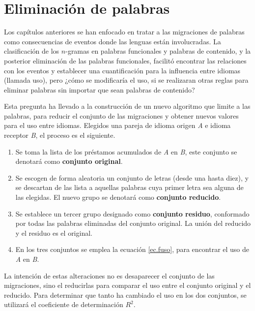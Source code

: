 \chapter{Eliminación de palabras}


Los capítulos anteriores se han enfocado en tratar a las migraciones de palabras como consecuencias de eventos donde  las lenguas están involucradas. La clasificación de los $n$-gramas en palabras funcionales y palabras de contenido, y la posterior eliminación de las palabras funcionales, facilitó encontrar las relaciones con los eventos y establecer una cuantificación para la influencia entre idiomas (llamada uso), pero ¿cómo se modificaría el uso, si se realizaran otras reglas para eliminar palabras sin importar que sean palabras de contenido?

Esta pregunta ha llevado a la construcción de un nuevo algoritmo que limite a las palabras,  para reducir el conjunto de las migraciones y obtener nuevos valores para el uso entre idiomas.  Elegidos una pareja de idioma origen \textit{A} e idioma receptor \textit{B}, el proceso es el siguiente. 


\begin{enumerate}
	
	\item Se toma la lista de los préstamos acumulados de \textit{A} en \textit{B},  este conjunto se denotará como \textbf{conjunto original}.
	
	\item Se escogen de forma aleatoria un conjunto de letras (desde una hasta diez), y se descartan de las lista a aquellas  palabras cuya primer letra sea alguna de las elegidas. El nuevo grupo se denotará como \textbf{conjunto reducido}.
	
	\item Se establece un tercer grupo designado como \textbf{conjunto residuo}, conformado por todas las palabras eliminadas del conjunto original.  La unión del reducido y el residuo es el original. 
	
	\item En los tres conjuntos se emplea la ecuación \ref{ec.fuso}, para encontrar el uso de \textit{A} en \textit{B}. 	
	
\end{enumerate}

La intención de estas alteraciones no es desaparecer el conjunto de las migraciones, sino el reducirlas para  comparar el uso entre el conjunto original y el reducido.  Para determinar que tanto ha cambiado el uso en los dos conjuntos, se utilizará el coeficiente de determinación $R^{2}$. 


